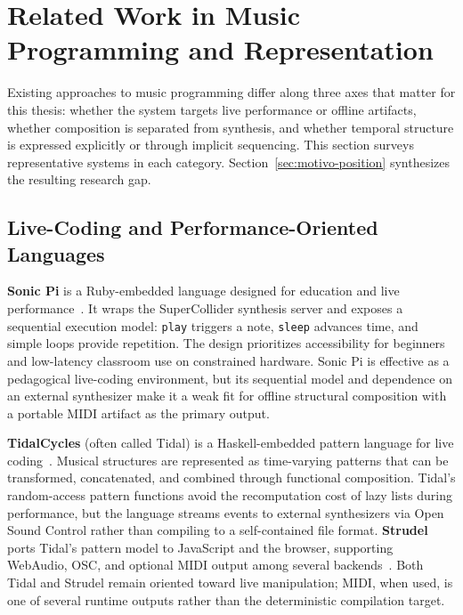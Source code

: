 \section{Related Work in Music Programming and Representation}\label{sec:related-work}

Existing approaches to music programming differ along three axes that matter for this thesis: whether the system
targets live performance or offline artifacts, whether composition is separated from synthesis, and whether temporal
structure is expressed explicitly or through implicit sequencing.
This section surveys representative systems in each category.
Section~\ref{sec:motivo-position} synthesizes the resulting research gap.

\subsection{Live-Coding and Performance-Oriented Languages}\label{subsec:live-coding-related}

\textbf{Sonic Pi} is a Ruby-embedded language designed for education and live performance~\cite{Aaron_Blackwell_2013,
Aaron_2016}.
It wraps the SuperCollider synthesis server and exposes a sequential execution model: \texttt{play} triggers a note,
\texttt{sleep} advances time, and simple loops provide repetition.
The design prioritizes accessibility for beginners and low-latency classroom use on constrained hardware.
Sonic Pi is effective as a pedagogical live-coding environment, but its sequential model and dependence on an external
synthesizer make it a weak fit for offline structural composition with a portable MIDI artifact as the primary output.

\textbf{TidalCycles} (often called Tidal) is a Haskell-embedded pattern language for live
coding~\cite{McLean_Wiggins_2010}.
Musical structures are represented as time-varying patterns that can be transformed, concatenated, and combined through
functional composition.
Tidal's random-access pattern functions avoid the recomputation cost of lazy lists during performance, but the language
streams events to external synthesizers via Open Sound Control rather than compiling to a self-contained file format.
\textbf{Strudel} ports Tidal's pattern model to JavaScript and the browser, supporting WebAudio, OSC, and optional MIDI
output among several backends~\cite{Roos_McLean_2023}.
Both Tidal and Strudel remain oriented toward live manipulation; MIDI, when used, is one of several runtime outputs
rather than the deterministic compilation target.

